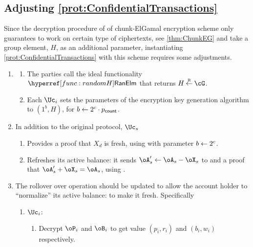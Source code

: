 \subsection{Adjusting  \cref{prot:ConfidentialTransactions}}\label{sec:ChanksEg:Adjusting}
Since the decryption procedure of of chunk-ElGamal  encryption scheme only guarantees to work on certain type of ciphertexts, see \cref{thm:ChunkEG} and take a group element, \ie $H$, as an additional parameter,  instantiating \cref{prot:ConfidentialTransactions} with this scheme  requires some adjustments.

\begin{enumerate}
	
	\item[Init:] 
	\begin{enumerate}
		\item The parties  call the ideal functionality $\randomH$ that returns $H \getsr \cG$.
		\item 	Each $\Uc_i$ sets the parameters of the encryption key generation algorithm to $(1^b,H)$, for  $b \leftarrow 2^{c}\cdot p_{\mathsf{count}}$.

	\end{enumerate}
 
	\item[Transfer.]   In addition to the original protocol, $\Uc_s$
	\begin{enumerate}
		\item Provides a proof that $X_d$ is fresh, \ie using \pZK{\rtFsh} with parameter $b\leftarrow 2^c$.
		
		\item Refreshes its active balance: it sends $\oA_s' \asn \oA_s - \oX_s$ to \Cc and a proof 
			that $\oA_s' + \oX_s = \oA_s$, using   \pZK{\rEqSk}.
			
	\end{enumerate}
	
	
	
	
	
	\item[Rollover:] The rollover over operation should be updated to allow the account holder to ``normalize''  its active balance: to make it fresh. Specifically
	
	\begin{enumerate}
		\item $\Uc_i$:
		
		\begin{enumerate}
			\item Decrypt $\oP_i$ and $\oB_i$ to get value $(p_i,r_i)$ and $(b_i,w_i)$ respectively.
			

\end{enumerate}
\end{enumerate}
\end{enumerate}
